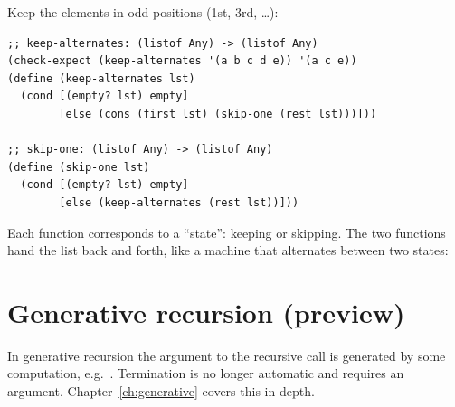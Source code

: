 \begin{example}
Keep the elements in odd positions (1st, 3rd, \ldots):
\begin{lstlisting}[style=racket]
;; keep-alternates: (listof Any) -> (listof Any)
(check-expect (keep-alternates '(a b c d e)) '(a c e))
(define (keep-alternates lst)
  (cond [(empty? lst) empty]
        [else (cons (first lst) (skip-one (rest lst)))]))

;; skip-one: (listof Any) -> (listof Any)
(define (skip-one lst)
  (cond [(empty? lst) empty]
        [else (keep-alternates (rest lst))]))
\end{lstlisting}
Each function corresponds to a ``state'': keeping or skipping. The two
functions hand the list back and forth, like a machine that alternates
between two states:

\begin{center}
\end{center}
\end{example}

\section{Generative recursion (preview)}
In generative recursion the argument to the recursive call is generated by
some computation, e.g.\ . Termination is no
longer automatic and requires an argument. Chapter~\ref{ch:generative} covers
this in depth.

